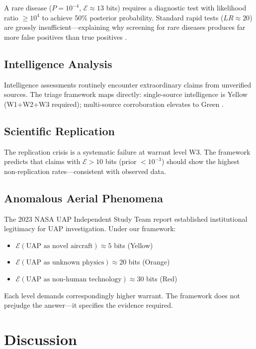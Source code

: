 \documentclass[12pt, a4paper]{article}
\theoremstyle{plain}
\theoremstyle{definition}
\theoremstyle{remark}
\begin{document}
A rare disease ($P = 10^{-4}$, $\mathcal{E} \approx 13$ bits) requires
a diagnostic test with likelihood ratio $\geq 10^4$ to achieve 50\%
posterior probability. Standard rapid tests ($LR \approx 20$) are
grossly insufficient---explaining why screening for rare diseases
produces far more false positives than true positives \citep{Gigerenzer2002}.

\subsection{Intelligence Analysis}

Intelligence assessments routinely encounter extraordinary claims from
unverified sources. The triage framework maps directly: single-source
intelligence is Yellow (W1+W2+W3 required); multi-source corroboration
elevates to Green \citep{Heuer1999}.

\subsection{Scientific Replication}

The replication crisis \citep{OpenScienceCollab2015} is a systematic
failure at warrant level W3. The framework predicts that claims with
$\mathcal{E} > 10$ bits (prior $< 10^{-3}$) should show the highest
non-replication rates---consistent with observed data.

\subsection{Anomalous Aerial Phenomena}

The 2023 NASA UAP Independent Study Team report \citep{NASA2023}
established institutional legitimacy for UAP investigation. Under our
framework:
\begin{itemize}
  \item $\mathcal{E}(\text{UAP as novel aircraft}) \approx 5$ bits
    (Yellow)
  \item $\mathcal{E}(\text{UAP as unknown physics}) \approx 20$ bits
    (Orange)
  \item $\mathcal{E}(\text{UAP as non-human technology}) \approx 30$
    bits (Red)
\end{itemize}

Each level demands correspondingly higher warrant. The framework does
not prejudge the answer---it specifies the evidence required.

\section{Discussion}\label{sec:discussion}
\end{document}
